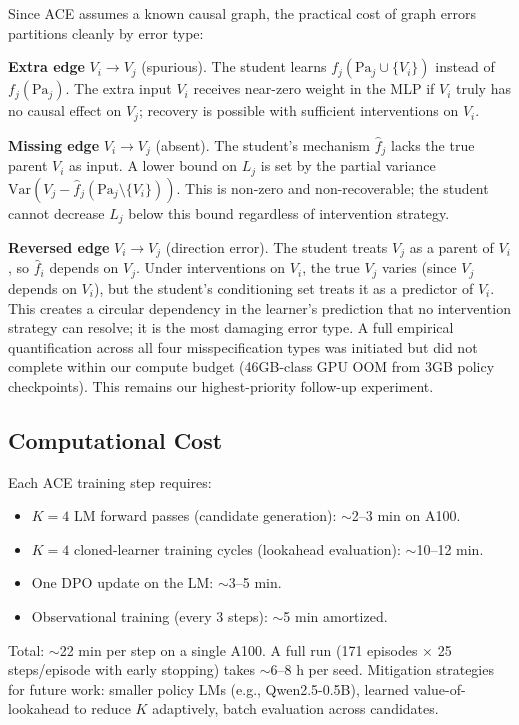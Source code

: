 Since ACE assumes a known causal graph, the practical cost of graph errors partitions cleanly by error type:

\textbf{Extra edge} $V_i \to V_j$ (spurious). The student learns $f_j(\text{Pa}_j \cup \{V_i\})$ instead of $f_j(\text{Pa}_j)$. The extra input $V_i$ receives near-zero weight in the MLP if $V_i$ truly has no causal effect on $V_j$; recovery is possible with sufficient interventions on $V_i$.

\textbf{Missing edge} $V_i \to V_j$ (absent). The student's mechanism $\hat{f}_j$ lacks the true parent $V_i$ as input. A lower bound on $L_j$ is set by the partial variance $\text{Var}(V_j - \hat{f}_j(\text{Pa}_j \setminus \{V_i\}))$. This is non-zero and non-recoverable; the student cannot decrease $L_j$ below this bound regardless of intervention strategy.

\textbf{Reversed edge} $V_i \to V_j$ (direction error). The student treats $V_j$ as a parent of $V_i$, so $\hat{f}_i$ depends on $V_j$. Under interventions on $V_i$, the true $V_j$ varies (since $V_j$ depends on $V_i$), but the student's conditioning set treats it as a predictor of $V_i$. This creates a circular dependency in the learner's prediction that no intervention strategy can resolve; it is the most damaging error type. A full empirical quantification across all four misspecification types was initiated but did not complete within our compute budget (46GB-class GPU OOM from 3GB policy checkpoints). This remains our highest-priority follow-up experiment.

\subsection{Computational Cost}
\label{app:compute}

Each ACE training step requires:
\begin{itemize}[leftmargin=1.2em,topsep=0.2em,itemsep=0.1em]
\item $K=4$ LM forward passes (candidate generation): $\sim$2--3 min on A100.
\item $K=4$ cloned-learner training cycles (lookahead evaluation): $\sim$10--12 min.
\item One DPO update on the LM: $\sim$3--5 min.
\item Observational training (every 3 steps): $\sim$5 min amortized.
\end{itemize}
Total: $\sim$22 min per step on a single A100. A full run (171 episodes $\times$ 25 steps/episode with early stopping) takes $\sim$6--8 h per seed. Mitigation strategies for future work: smaller policy LMs (e.g., Qwen2.5-0.5B), learned value-of-lookahead to reduce $K$ adaptively, batch evaluation across candidates.

